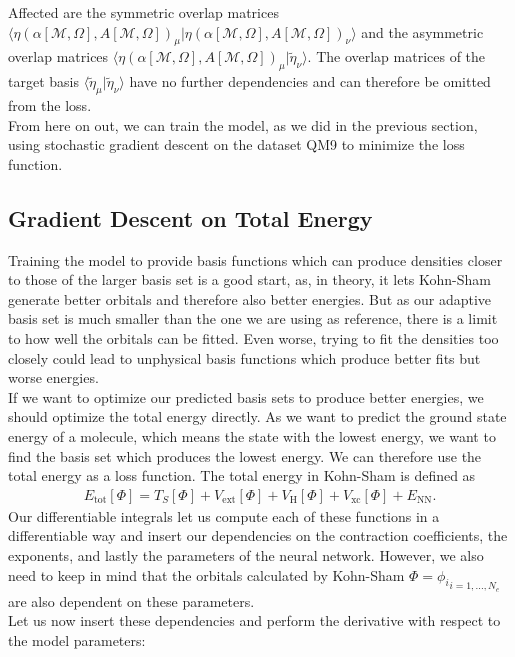 Affected are the symmetric overlap matrices $\langle\eta(\alpha[\mathcal{M},\Omega],A[\mathcal{M},\Omega])_\mu|\eta(\alpha[\mathcal{M},\Omega],A[\mathcal{M},\Omega])_\nu\rangle$ and the asymmetric overlap matrices $\langle\eta(\alpha[\mathcal{M},\Omega],A[\mathcal{M},\Omega])_\mu|\tilde \eta_\nu\rangle$.
The overlap matrices of the target basis $\langle\tilde \eta_\mu|\tilde \eta_\nu\rangle$ have no further dependencies and can therefore be omitted from the loss.\\
From here on out, we can train the model, as we did in the previous section, using stochastic gradient descent on the dataset QM9 to minimize the loss function.

\subsection{Gradient Descent on Total Energy}
Training the model to provide basis functions which can produce densities closer to those of the larger basis set is a good start, as, in theory, it lets Kohn-Sham generate better orbitals and therefore also better energies.
But as our adaptive basis set is much smaller than the one we are using as reference, there is a limit to how well the orbitals can be fitted.
Even worse, trying to fit the densities too closely could lead to unphysical basis functions which produce better fits but worse energies.\\ If we want to optimize our predicted basis sets to produce better energies, we should optimize the total energy directly.
As we want to predict the ground state energy of a molecule, which means the state with the lowest energy, we want to find the basis set which produces the lowest energy.
We can therefore use the total energy as a loss function.
The total energy in Kohn-Sham is defined as
\begin{align}
    E_{\text{tot}}[\Phi] = T_S[\Phi] + V_{\text{ext}}[\Phi] + V_{\text{H}}[\Phi] + V_{\text{xc}}[\Phi] + E_{\text{NN}}.
\end{align}
Our differentiable integrals let us compute each of these functions in a differentiable way and insert our dependencies on the contraction coefficients, the exponents, and lastly the parameters of the neural network.
However, we also need to keep in mind that the orbitals calculated by Kohn-Sham $\Phi = {\phi_i}_{i=1,...,N_e}$ are also dependent on these parameters. \\
Let us now insert these dependencies and perform the derivative with respect to the model parameters:

